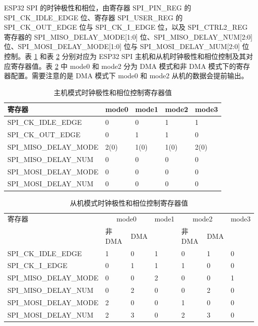\documentclass[main\_\_CN.tex]{subfiles}
\begin{document}
ESP32 SPI 的时钟极性和相位，由寄存器 SPI\_PIN\_REG 的 SPI\_CK\_IDLE\_EDGE 位、寄存器 SPI\_USER\_REG 的 SPI\_CK\_OUT\_EDGE 位与 SPI\_CK\_I\_EDGE 位，以及 SPI\_CTRL2\_REG 寄存器的 SPI\_MISO\_DELAY\_MODE[1:0] 位、SPI\_MISO\_DELAY\_NUM[2:0] 位、SPI\_MOSI\_DELAY\_MODE[1:0] 位与 SPI\_MOSI\_DELAY\_MUM[2:0] 位控制。表 \ref{table:clockpol_master} 和表 \ref{table:clockpol_slave} 分别对应为 ESP32 SPI 主机和从机时钟极性和相位控制及其对应寄存器值。表 \ref{table:clockpol_slave} 中 mode0 和 mode2 分为 DMA 模式和非 DMA 模式下的寄存器配置。需要注意的是 DMA 模式下 mode0 和 mode2 从机的数据会提前输出。

\begin{table}[H]
    \centering
    \caption{主机模式时钟极性和相位控制寄存器值}
    \label{table:clockpol_master}
    \begin{tabular}[c]{|p{5cm}|p{2cm}|p{2cm}|p{2cm}|p{2cm}|}
    \hline
    \rowcolor{lightgray}
    寄存器 & mode0 & mode1 & mode2 & mode3\\
    \hline
    SPI\_CK\_IDLE\_EDGE & 0 & 0 & 1 & 1\\
    \hline
    SPI\_CK\_OUT\_EDGE  & 0 & 1 & 1 & 0\\
    \hline
    SPI\_MISO\_DELAY\_MODE & 2(0) & 1(0) & 1(0) & 2(0)\\
    \hline
    SPI\_MISO\_DELAY\_NUM & 0 & 0 & 0 & 0\\
    \hline
    SPI\_MOSI\_DELAY\_MODE & 0 & 0 & 0 & 0\\
    \hline
    SPI\_MOSI\_DELAY\_NUM & 0 & 0 & 0 & 0\\
    \hline
    \end{tabular}
\end{table}

\begin{longtable}[c]{|p{4.5cm}|p{1.5cm}|p{1.5cm}|p{1.5cm}|p{1.5cm}|p{1.5cm}|p{1.5cm}|}
\caption{从机模式时钟极性和相位控制寄存器值}\label{table:clockpol_slave}
\\\hline
\rowcolor{lightgray}
寄存器& \multicolumn{2}{c|}{mode0} & mode1 & \multicolumn{2}{c|}{mode2} & mode3\\\cline{2-3}\cline{5-6}
\rowcolor{lightgray}
&非 DMA&DMA&&非 DMA&DMA&\\\hline
    SPI\_CK\_IDLE\_EDGE & 1 & 0  & 1 & 0 & 1 & 0\\\hline
    SPI\_CK\_I\_EDGE  & 0 & 1  & 1 & 1 & 0  & 0\\\hline
    SPI\_MISO\_DELAY\_MODE & 0 & 0  & 2 & 0 & 0  & 1\\\hline
    SPI\_MISO\_DELAY\_NUM & 0 & 2  & 0 & 0 & 2  & 0\\\hline
    SPI\_MOSI\_DELAY\_MODE & 2 & 0  & 0 & 1 & 0  & 0\\\hline
    SPI\_MOSI\_DELAY\_NUM & 2 & 3  & 0 & 2 & 3  & 0\\\hline
\end{longtable}
\end{document}
